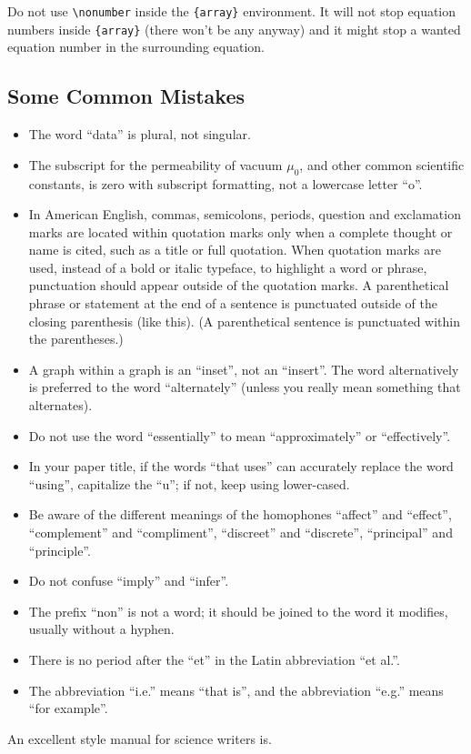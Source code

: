 \documentclass[conference]{IEEEtran}
\begin{document}
Do not use \verb|\nonumber| inside the \verb|{array}| environment. It
will not stop equation numbers inside \verb|{array}| (there won't be
any anyway) and it might stop a wanted equation number in the
surrounding equation.

\subsection{Some Common Mistakes}\label{SCM}
\begin{itemize}
\item The word ``data'' is plural, not singular.
\item The subscript for the permeability of vacuum $\mu_{0}$, and other common scientific constants, is zero with subscript formatting, not a lowercase letter ``o''.
\item In American English, commas, semicolons, periods, question and exclamation marks are located within quotation marks only when a complete thought or name is cited, such as a title or full quotation. When quotation marks are used, instead of a bold or italic typeface, to highlight a word or phrase, punctuation should appear outside of the quotation marks. A parenthetical phrase or statement at the end of a sentence is punctuated outside of the closing parenthesis (like this). (A parenthetical sentence is punctuated within the parentheses.)
\item A graph within a graph is an ``inset'', not an ``insert''. The word alternatively is preferred to the word ``alternately'' (unless you really mean something that alternates).
\item Do not use the word ``essentially'' to mean ``approximately'' or ``effectively''.
\item In your paper title, if the words ``that uses'' can accurately replace the word ``using'', capitalize the ``u''; if not, keep using lower-cased.
\item Be aware of the different meanings of the homophones ``affect'' and ``effect'', ``complement'' and ``compliment'', ``discreet'' and ``discrete'', ``principal'' and ``principle''.
\item Do not confuse ``imply'' and ``infer''.
\item The prefix ``non'' is not a word; it should be joined to the word it modifies, usually without a hyphen.
\item There is no period after the ``et'' in the Latin abbreviation ``et al.''.
\item The abbreviation ``i.e.'' means ``that is'', and the abbreviation ``e.g.'' means ``for example''.
\end{itemize}
An excellent style manual for science writers is.
\end{document}
